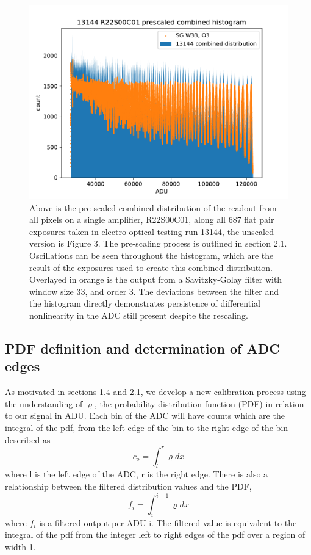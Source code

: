 \documentclass[11pt, letterpaper]{article}
\begin{document}
\begin{figure}
    \centering
    \includegraphics[width=0.5\linewidth]{bar13144.pdf}
    \caption{Above is the pre-scaled combined distribution of the readout from all pixels on a single amplifier, R22S00C01, along all 687 flat pair exposures taken in electro-optical testing run 13144, the unscaled version is Figure 3. The pre-scaling process is outlined in section 2.1. Oscillations can be seen throughout the histogram, which are the result of the exposures used to create this combined distribution. Overlayed in orange is the output from a Savitzky-Golay filter with window size 33, and order 3. The deviations between the filter and the histogram directly demonstrates persistence of differential nonlinearity in the ADC still present despite the rescaling.}
    \label{fig:enter-label}
\end{figure}


\subsection{PDF definition and determination of ADC edges} 	
\indent

As motivated in sections 1.4 and 2.1, we develop a new calibration process using the understanding of $\varrho$, the probability distribution function (PDF) in relation to our signal in ADU. 
Each bin of the ADC will have counts which are the integral of the pdf, from the left edge of the bin to the right edge of the bin described as
 \begin{equation}\label{}
c_o =  \int_{l}^{r} \varrho dx
\end{equation}
where l is the left edge of the ADC, r is the right edge. 
There is also a relationship between the filtered distribution values and the PDF,
 \begin{equation}\label{}
f_i =  \int_{i}^{i+1} \varrho dx
\end{equation}
where $f_{i}$ is a filtered output per ADU i. 
The filtered value is equivalent to the integral of the pdf from the integer left to right edges of the pdf over a region of width 1. 
\indent 
\end{document}
